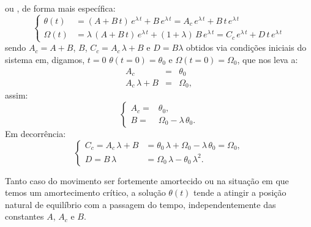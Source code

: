 \documentclass[12pt,openright,twoside,english,brazil]{abntex2}
\begin{document}
ou , de forma mais específica:
\begin{equation}
 \begin{cases}
 \theta(t) & = (A + B\, t)\,  e^{\lambda\, t} + B\, e^{\lambda \, t} = A_c \, e^{\lambda\, t} + B\, t\, e^{\lambda\, t} \\
 \Omega(t) & = \lambda\, (A + B\, t)\,  e^{\lambda \, t} + (1+\lambda)\, B \, e^{\lambda\, t} = C_c\, e^{\lambda\, t} + D\, t\, e^{\lambda\, t}
 \end{cases}
 \label{equa112}
\end{equation}
sendo $A_c = A + B$, $B$, $C_c=A_c\, \lambda+B$ e $D=B \lambda$ obtidos via condições iniciais do sistema em, digamos, $t=0$ $\theta(t=0)=\theta_0$ e $\Omega(t=0)=\Omega_0$, que nos leva a:
\begin{eqnarray}
 A_c & = & \theta_0 \nonumber \\
 A_c\, \lambda + B & = & \Omega_0, \nonumber
\end{eqnarray}
assim:
\begin{equation}
 \begin{cases}
  A_c = & \theta_0, \\
  B = & \Omega_0 - \lambda \, \theta_0.
 \end{cases}
 \label{equa113}
\end{equation}
Em decorrência:
\begin{equation}
 \begin{cases}
  C_c = A_c\, \lambda + B & =  \theta_0 \, \lambda + \Omega_0 - \lambda \, \theta_0 = \Omega_0, \\
  D = B\, \lambda & =  \Omega_0 \, \lambda - \theta_0 \, \lambda^2.
 \end{cases}
 \label{equa114}
\end{equation}



Tanto caso do movimento ser fortemente amortecido ou na situação em que temos um amortecimento crítico, a solução $\theta(t)$ tende a atingir a posição natural de equilíbrio com a passagem do tempo, independentemente das constantes $A$, $A_c$ e $B$.
\end{document}
